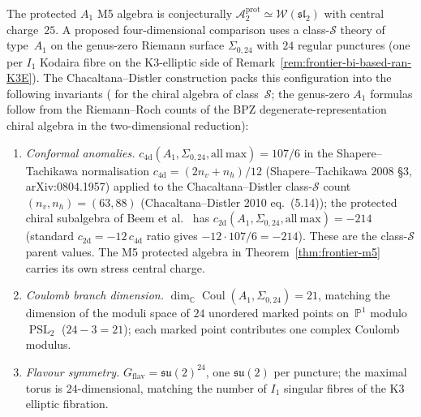 \begin{remark}[Class-$\mathcal S$ $A_1$ on $\Sigma_{0,24}$ as the
$\mathcal N{=}2$ parent of the K3-coupled M5 datum]
\label{rem:frontier-class-S-K3-parent}
\ClaimStatusConjectured
{}
The protected $A_1$ M5 algebra is conjecturally
$\mathcal A_2^{\mathrm{prot}}\simeq
\mathcal W(\mathfrak{sl}_2)$ with central charge~$25$.
A proposed four-dimensional comparison uses a class-$\mathcal S$
theory of type~$A_1$
on the genus-zero Riemann surface $\Sigma_{0,24}$ with $24$ regular
punctures (one per $I_1$ Kodaira fibre on the K3-elliptic side of
Remark~\ref{rem:frontier-bi-based-ran-K3E}). The Chacaltana--Distler
construction packs this configuration into the following invariants
\textup{(}\cite{Arakawa17} for the chiral algebra of class~$\mathcal S$;
the genus-zero $A_1$ formulas
follow from the Riemann--Roch
counts of the BPZ degenerate-representation chiral algebra in the
two-dimensional reduction\textup{)}:
\begin{enumerate}[label=\textup{(\roman*)}]
\item \emph{Conformal anomalies.}
 $c_{4\mathrm d}(A_1, \Sigma_{0,24}, \mathrm{all\ max}) = 107/6$
 in the Shapere--Tachikawa normalisation
 $c_{4\mathrm d} = (2n_v + n_h)/12$
 \textup{(}Shapere--Tachikawa 2008 \S 3, arXiv:0804.1957\textup{)}
 applied to the Chacaltana--Distler class-$\mathcal S$ count
 $(n_v, n_h) = (63, 88)$
 \textup{(}Chacaltana--Distler 2010 eq.~(5.14)\textup{)};
 the protected chiral subalgebra of Beem et
 al.~\cite{Beem-etal-2014} has
 $c_{2\mathrm d}(A_1, \Sigma_{0,24}, \mathrm{all\ max}) = -214$
 \textup{(}standard $c_{2\mathrm d} = -12\,c_{4\mathrm d}$ ratio
 gives $-12\cdot 107/6 = -214$\textup{)}.
 These are the class-$\mathcal S$ parent values.  The M5 protected
 algebra in Theorem~\ref{thm:frontier-m5} carries its own stress
 central charge.
\item \emph{Coulomb branch dimension.}
 $\dim_{\mathbb C}\operatorname{Coul}(A_1, \Sigma_{0,24}) = 21$,
 matching the dimension of the moduli space of $24$ unordered
 marked points on~$\mathbb{P}^1$ modulo $\operatorname{PSL}_2$
 \textup{(}$24 - 3 = 21$\textup{)}; each marked point contributes
 one complex Coulomb modulus.
\item \emph{Flavour symmetry.}
 $G_{\mathrm{flav}} = \mathfrak{su}(2)^{24}$, one $\mathfrak{su}(2)$
 per puncture; the maximal torus is $24$-dimensional, matching the
 number of $I_1$ singular fibres of the K3 elliptic fibration.

\end{enumerate}
\end{remark}
